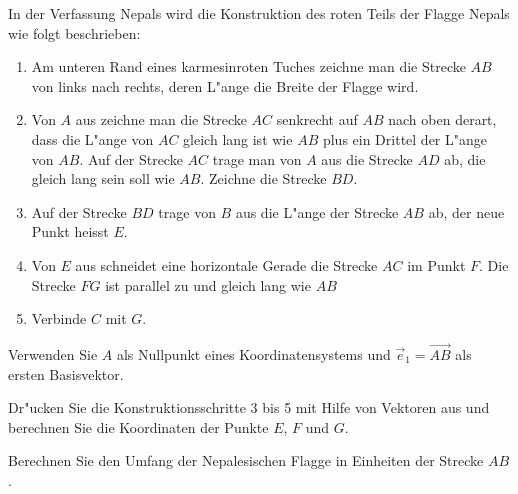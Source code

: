 In der Verfassung Nepals wird die Konstruktion des roten Teils der
Flagge Nepals wie folgt beschrieben:
\begin{enumerate}
\item Am unteren Rand eines karmesinroten Tuches zeichne man die Strecke
$AB$ von links nach rechts, deren L"ange die Breite der Flagge wird.
\item Von $A$ aus zeichne man die Strecke $AC$ senkrecht auf $AB$ nach
oben derart, dass die L"ange von $AC$ gleich lang ist wie $AB$ plus
ein Drittel der L"ange von $AB$.
Auf der Strecke $AC$ trage man von $A$ aus die Strecke $AD$ ab, die
gleich lang sein soll wie $AB$.
Zeichne die Strecke $BD$.
\item Auf der Strecke $BD$ trage von $B$ aus die L"ange der Strecke $AB$ ab,
der neue Punkt heisst $E$.
\item Von $E$ aus schneidet eine horizontale Gerade die Strecke $AC$ im
Punkt $F$.
Die Strecke $FG$ ist parallel zu und gleich lang wie $AB$
\item Verbinde $C$ mit $G$.
\end{enumerate}
\begin{center}
\qquad
\qquad
\qquad
{}
\end{center}
Verwenden Sie $A$ als Nullpunkt eines Koordinatensystems und
$\vec{e}_1=\overrightarrow{AB}$
als ersten Basisvektor.
\begin{teilaufgaben}
\item
Dr"ucken Sie die Konstruktionsschritte 3 bis 5 mit Hilfe von Vektoren aus
und berechnen Sie die Koordinaten der Punkte $E$, $F$ und $G$.
\item
Berechnen Sie den Umfang der Nepalesischen Flagge in Einheiten der Strecke
$AB$.
\end{teilaufgaben}

